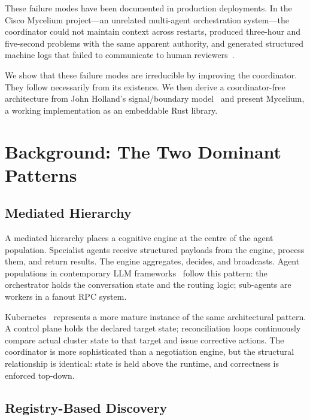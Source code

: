\documentclass[11pt]{article}
\begin{document}
These failure modes have been documented in production deployments. In the
Cisco Mycelium project---an unrelated multi-agent orchestration system---the
coordinator could not maintain context across restarts, produced three-hour
and five-second problems with the same apparent authority, and generated
structured machine logs that failed to communicate to human
reviewers~\cite{signal-noise,context-problem}.

We show that these failure modes are irreducible by improving the coordinator.
They follow necessarily from its existence. We then derive a coordinator-free
architecture from John Holland's signal/boundary model~\cite{holland} and present
Mycelium, a working implementation as an embeddable Rust library.

\section{Background: The Two Dominant Patterns}

\subsection{Mediated Hierarchy}

A mediated hierarchy places a cognitive engine at the centre of the agent
population. Specialist agents receive structured payloads from the engine, process
them, and return results. The engine aggregates, decides, and broadcasts. Agent
populations in contemporary LLM frameworks~\cite{mas-survey} follow this pattern:
the orchestrator holds the conversation state and the routing logic; sub-agents
are workers in a fanout RPC system.

Kubernetes~\cite{kubernetes} represents a more mature instance of the same
architectural pattern. A control plane holds the declared target state;
reconciliation loops continuously compare actual cluster state to that target and
issue corrective actions. The coordinator is more sophisticated than a negotiation
engine, but the structural relationship is identical: state is held above the
runtime, and correctness is enforced top-down.

\subsection{Registry-Based Discovery}
\end{document}

